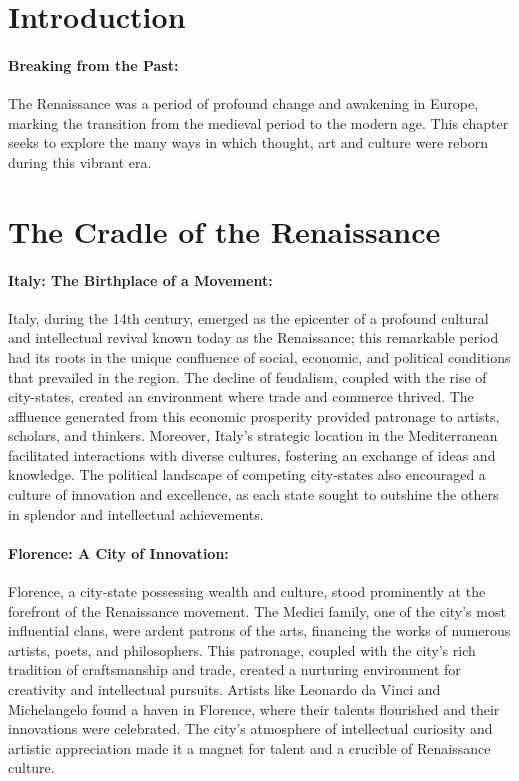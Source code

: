 \documentclass{book}
\begin{document}
\section*{Introduction}

\paragraph{Breaking from the Past:}
The Renaissance was a period of profound change and awakening in Europe, marking the transition from the medieval period to the modern age. This chapter seeks to explore the many ways in which thought, art and culture were reborn during this vibrant era.

\section*{The Cradle of the Renaissance}

\paragraph{Italy: The Birthplace of a Movement:}
Italy, during the 14th century, emerged as the epicenter of a profound cultural and intellectual revival known today as the Renaissance; this remarkable period had its roots in the unique confluence of social, economic, and political conditions that prevailed in the region. The decline of feudalism, coupled with the rise of city-states, created an environment where trade and commerce thrived. The affluence generated from this economic prosperity provided patronage to artists, scholars, and thinkers. Moreover, Italy's strategic location in the Mediterranean facilitated interactions with diverse cultures, fostering an exchange of ideas and knowledge. The political landscape of competing city-states also encouraged a culture of innovation and excellence, as each state sought to outshine the others in splendor and intellectual achievements.

\paragraph{Florence: A City of Innovation:}
Florence, a city-state possessing wealth and culture, stood prominently at the forefront of the Renaissance movement. The Medici family, one of the city’s most influential clans, were ardent patrons of the arts, financing the works of numerous artists, poets, and philosophers. This patronage, coupled with the city’s rich tradition of craftsmanship and trade, created a nurturing environment for creativity and intellectual pursuits. Artists like Leonardo da Vinci and Michelangelo found a haven in Florence, where their talents flourished and their innovations were celebrated. The city’s atmosphere of intellectual curiosity and artistic appreciation made it a magnet for talent and a crucible of Renaissance culture.
\end{document}
